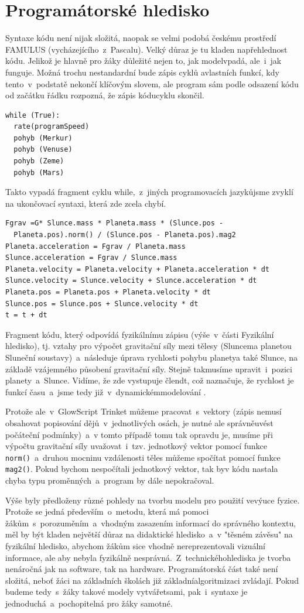 \documentclass[FM,BP]{tulthesis}
\begin{document}
\section{Programátorské hledisko}
Syntaxe kódu není nijak složitá, naopak se velmi podobá českému prostředí FAMULUS (vycházejícího~z~Pascalu). Velký důraz je tu kladen napřehlednost kódu. Jelikož je hlavně pro žáky důležité nejen to, jak modelvpadá, ale~i~jak funguje. Možná trochu nestandardní bude zápis cyklů avlastních funkcí, kdy tento~v~podstatě nekončí klíčovým slovem, ale program sám podle odsazení kódu od začátku řádku rozpozná, že zápis kóducyklu skončil.
\begin{verbatim}
while (True):
  rate(programSpeed)
  pohyb (Merkur)
  pohyb (Venuse)
  pohyb (Zeme)
  pohyb (Mars)
\end{verbatim}
Takto vypadá fragment cyklu while,~z~jiných programovacích jazykůjsme zvyklí na ukončovací syntaxi, která zde zcela chybí.
\begin{verbatim}
Fgrav =G* Slunce.mass * Planeta.mass * (Slunce.pos - 
  Planeta.pos).norm() / (Slunce.pos - Planeta.pos).mag2
Planeta.acceleration = Fgrav / Planeta.mass
Slunce.acceleration = Fgrav / Slunce.mass
Planeta.velocity = Planeta.velocity + Planeta.acceleration * dt
Slunce.velocity = Slunce.velocity + Slunce.acceleration * dt
Planeta.pos = Planeta.pos + Planeta.velocity * dt
Slunce.pos = Slunce.pos + Slunce.velocity * dt
t = t + dt
\end{verbatim}
Fragment kódu, který odpovídá fyzikálnímu zápisu (výše~v~části Fyzikální hledisko), tj. vztahy pro výpočet gravitační síly mezi tělesy (Sluncema planetou Sluneční soustavy)~a~následuje úprava rychlosti pohybu planetya také Slunce, na základě vzájemného působení gravitační síly. Stejně takmusíme upravit~i~pozici planety~a~Slunce. Vidíme, že zde vystupuje člendt, což naznačuje, že rychlost je funkcí času~a~jsme tedy již~v~dynamickémmodelování \cite{c:7,c:8}.

Protože ale~v~GlowScript Trinket můžeme pracovat~s~vektory (zápis nemusí obsahovat popisování dějů~v~jednotlivých osách, je nutné ale správněuvést počáteční podmínky)~a~v tomto případě tomu tak opravdu je, musíme při výpočtu gravitační síly uvažovat~i~tzv. jednotkový vektor pomocí funkce \verb+norm()+~a~druhou mocninu vzdálenosti těles můžeme spočítat pomocí funkce \verb+mag2()+. Pokud bychom nespočítali jednotkový vektor, tak byv kódu nastala chyba typu proměnných~a~program by dále nepokračoval.

Výše byly předloženy různé pohledy na tvorbu modelu pro použití vevýuce fyzice. Protože se jedná především~o~metodu, která má pomoci žákům~s~porozuměním~a~vhodným zasazením informací do správného kontextu, měl by být kladen největší důraz na didaktické hledisko~a~v "těsném závěsu" na fyzikální hledisko, abychom žákům sice vhodně nereprezentovali vizuální informace, ale aby nebyla fyzikálně nesprávná.~Z~technickéhohlediska je tvorba nenáročná jak na software, tak na hardware. Programátorská část také není složitá, neboť žáci na základních školách již základníalgoritmizaci zvládají. Pokud budeme tedy~s~žáky takové modely vytvářetsami, pak~i~syntaxe je jednoduchá~a~pochopitelná pro žáky samotné.
\end{document}
